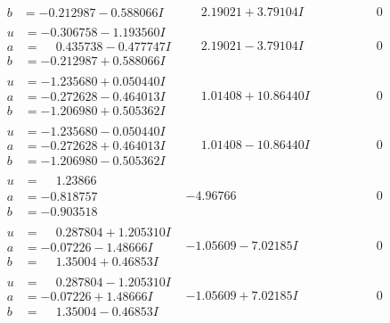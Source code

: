 \documentclass[1p]{elsarticle_modified}
\theoremstyle{definition}
\begin{document}
$$\begin{array}{c|c|c}
\begin{aligned}
b &= -0.212987 - 0.588066 I\end{aligned}
 & \phantom{-}2.19021 + 3.79104 I & \phantom{-0.000000 } 0 \\ \hline\begin{aligned}
u &= -0.306758 - 1.193560 I \\
a &= \phantom{-}0.435738 - 0.477747 I \\
b &= -0.212987 + 0.588066 I\end{aligned}
 & \phantom{-}2.19021 - 3.79104 I & \phantom{-0.000000 } 0 \\ \hline\begin{aligned}
u &= -1.235680 + 0.050440 I \\
a &= -0.272628 - 0.464013 I \\
b &= -1.206980 + 0.505362 I\end{aligned}
 & \phantom{-}1.01408 + 10.86440 I & \phantom{-0.000000 } 0 \\ \hline\begin{aligned}
u &= -1.235680 - 0.050440 I \\
a &= -0.272628 + 0.464013 I \\
b &= -1.206980 - 0.505362 I\end{aligned}
 & \phantom{-}1.01408 - 10.86440 I & \phantom{-0.000000 } 0 \\ \hline\begin{aligned}
u &= \phantom{-}1.23866\phantom{ +0.000000I} \\
a &= -0.818757\phantom{ +0.000000I} \\
b &= -0.903518\phantom{ +0.000000I}\end{aligned}
 & -4.96766\phantom{ +0.000000I} & \phantom{-0.000000 } 0 \\ \hline\begin{aligned}
u &= \phantom{-}0.287804 + 1.205310 I \\
a &= -0.07226 - 1.48666 I \\
b &= \phantom{-}1.35004 + 0.46853 I\end{aligned}
 & -1.05609 - 7.02185 I & \phantom{-0.000000 } 0 \\ \hline\begin{aligned}
u &= \phantom{-}0.287804 - 1.205310 I \\
a &= -0.07226 + 1.48666 I \\
b &= \phantom{-}1.35004 - 0.46853 I\end{aligned}
 & -1.05609 + 7.02185 I & \phantom{-0.000000 } 0 \\ \hline\begin{aligned}

\end{aligned}
\end{array}$$
\end{document}
